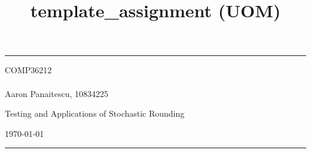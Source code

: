 \documentclass[a4paper]{article} %
\begin{document}

\title{template_assignment (UOM)} %
\fancyhead[C]{}
\hrule \medskip %
\begin{minipage}{0.295\textwidth} %
\raggedright
COMP36212\\ %
\footnotesize %
\hfill\\
Aaron Panaitescu, 10834225%
\end{minipage}
\begin{minipage}{0.4\textwidth} %
\centering
\large %
Testing and Applications of Stochastic Rounding
\\ %
\end{minipage}
\begin{minipage}{0.295\textwidth} %
\raggedleft
\today\\ %
\end{minipage}
\medskip\hrule %
\bigskip

\end{document}
